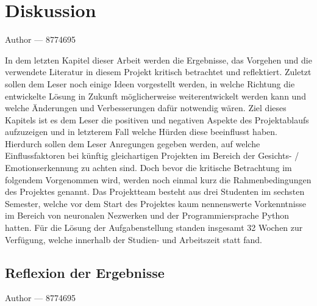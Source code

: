 \documentclass[12pt, a4paper]{report}
\makeatletter
\newcommand{\sectionauthor}[1]{%
  {\parindent0pt\vspace*{-5pt}%
  \large{Author --- }
  \linespread{1.1}\large\scshape#1%
  \par\nobreak\vspace*{35pt} }
  \@afterheading%
}
\newcommand{\chapterauthor}[1]{%
  {\parindent0pt\vspace*{-25pt}%
  \large{Author --- }
  \linespread{1.1}\large\scshape#1%
  \par\nobreak\vspace*{35pt} }
  \@afterheading%
}
\makeatother
\begin{document}
\chapter{Diskussion}
\chapterauthor{8774695}
In dem letzten Kapitel dieser Arbeit werden die Ergebnisse, das Vorgehen und die verwendete Literatur in diesem Projekt  kritisch betrachtet und reflektiert. Zuletzt sollen dem Leser noch einige Ideen vorgestellt werden, in welche Richtung die entwickelte Lösung in Zukunft möglicherweise weiterentwickelt werden kann und welche Änderungen und Verbesserungen dafür notwendig wären. Ziel dieses Kapitels ist es dem Leser die positiven und negativen Aspekte des Projektablaufs aufzuzeigen und in letzterem Fall welche Hürden diese beeinflusst haben. Hierdurch sollen dem Leser Anregungen gegeben werden, auf welche Einflussfaktoren bei künftig gleichartigen Projekten im Bereich der Gesichts- / Emotionserkennung zu achten sind.
Doch bevor die kritische Betrachtung im folgendem Vorgenommen wird, werden noch einmal kurz die Rahmenbedingungen des Projektes genannt. Das Projektteam besteht aus drei Studenten im sechsten Semester, welche vor dem Start des Projektes kaum nennenswerte Vorkenntnisse im Bereich von neuronalen Nezwerken und der Programmiersprache Python hatten. Für die Lösung der Aufgabenstellung standen insgesamt 32 Wochen zur Verfügung, welche innerhalb der Studien- und Arbeitszeit statt fand.

\section{Reflexion der Ergebnisse}
\sectionauthor{8774695}
\end{document}
